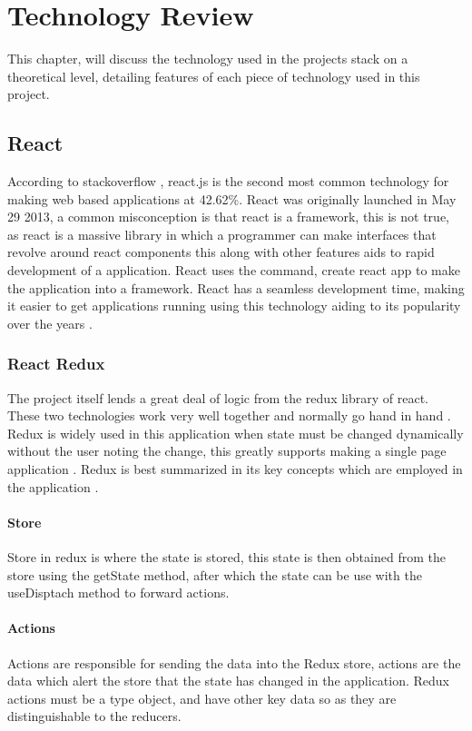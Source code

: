 \chapter{Technology Review}
This chapter, will discuss the technology used in the projects stack on a theoretical level, detailing features of each piece of technology used in this project.

\section{React}
According to stackoverflow \cite{StackOverflowSurvey}, react.js is the second most common technology for making web based applications at 42.62\%. React was originally launched in May 29 2013, a common misconception is that react is a framework, this is not true, as react is a massive library in which a programmer can make interfaces that revolve around react components \cite{boduch2020react} this along with other features aids to rapid development of a application. React uses the command, create react app to make the application into a framework. React has a seamless development time, making it easier to get applications running using this technology aiding to its popularity over the years \cite{saundariya2021webapp}.

\subsection{React Redux}
The project itself lends a great deal of logic from the redux library of react. These two technologies work very well together and normally go hand in hand \cite{nelson2019developing}. Redux is widely used in this application when state must be changed dynamically without the user noting the change, this greatly supports making a single page application \cite{jadhav2015single}. Redux is best summarized in its key concepts which are employed in the application \cite{caspers2017react}.

\subsubsection{Store}
Store in redux is where the state is stored, this state is then obtained from the store using the getState method, after which the state can be use with the useDisptach method to forward actions.

\subsubsection{Actions}
Actions are responsible for sending the data into the Redux store, actions are the data which alert the store that the state has changed in the application. Redux actions must be a type object, and have other key data so as they are distinguishable to the reducers.

